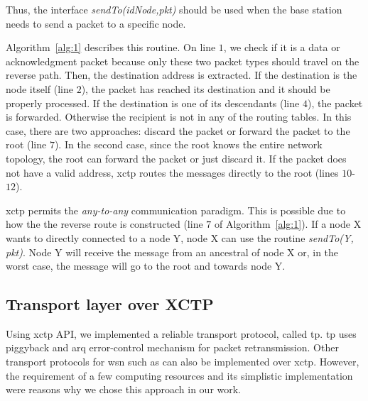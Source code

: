 Thus, the interface \textit{sendTo(idNode,pkt)} should be used when
the base station needs to send a packet to a specific node.

Algorithm~\ref{alg:1} describes this routine. On line $1$, we check
if it is a data or acknowledgment packet because only these two
packet types should travel on the reverse path. Then, the
destination address is extracted. If the destination is the node
itself (line $2$), the packet has reached its destination and it
should be properly processed. If the destination is one of its
descendants (line $4$), the packet is forwarded. Otherwise the
recipient is not in any of the routing tables. In this case, there
are two approaches: discard the packet or forward the packet to the
root (line $7$). In the second case, since the root knows the entire
network topology, the root can forward the packet or just discard
it. If the packet does not have a valid address, \ac{xctp} routes
the messages directly to the root (lines $10$-$12$).

\ac{xctp} permits the \textit{any-to-any} communication paradigm.
This is possible due to how the the reverse route is constructed
(line $7$ of Algorithm~\ref{alg:1}). If a node X wants to directly
connected to a node Y, node X can use the routine \textit{sendTo(Y,
pkt)}. Node Y will receive the message from an ancestral of node X
or, in the worst case, the message will go to the root and towards
node Y.





\subsection{Transport layer over XCTP}
\label{sec:transport-layer-over-xctp}

Using \ac{xctp} API, we implemented a reliable transport protocol,
called \ac{tp}. \ac{tp} uses piggyback and \ac{arq} error-control
mechanism for packet retransmission. Other transport protocols for
\ac{wsn} such as \cite{RCRT, flush, STCP} can also be implemented
over \ac{xctp}. However, the requirement of a few computing
resources and its simplistic implementation were reasons why we
chose this approach in our work.
